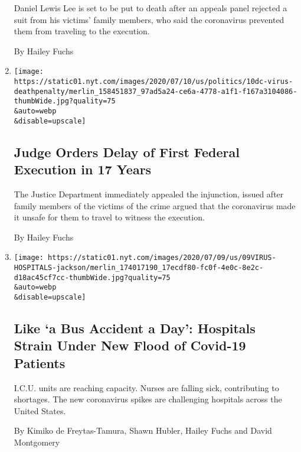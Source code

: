 \begin{enumerate}
  Daniel Lewis Lee is set to be put to death after an appeals panel
  rejected a suit from his victims' family members, who said the
  coronavirus prevented them from traveling to the execution.

  By Hailey Fuchs
\item
  \href{/2020/07/10/us/politics/first-federal-execution-delay.html}{}

  \texttt{[image: https://static01.nyt.com/images/2020/07/10/us/politics/10dc-virus-deathpenalty/merlin\_158451837\_97ad5a24-ce6a-4778-a1f1-f167a3104086-thumbWide.jpg?quality=75\\\&auto=webp\\\&disable=upscale]}

  \hypertarget{judge-orders-delay-of-first-federal-execution-in-17-years}{%
  \subsection{Judge Orders Delay of First Federal Execution in 17
  Years}\label{judge-orders-delay-of-first-federal-execution-in-17-years}}

  The Justice Department immediately appealed the injunction, issued
  after family members of the victims of the crime argued that the
  coronavirus made it unsafe for them to travel to witness the
  execution.

  By Hailey Fuchs
\item
  \href{/2020/07/09/us/coronavirus-hospitals-capacity.html}{}

  \texttt{[image: https://static01.nyt.com/images/2020/07/09/us/09VIRUS-HOSPITALS-jackson/merlin\_174017190\_17ecdf80-fc0f-4e0c-8e2c-d18ac45cf7cc-thumbWide.jpg?quality=75\\\&auto=webp\\\&disable=upscale]}

  \hypertarget{like-a-bus-accident-a-day-hospitals-strain-under-new-flood-of-covid-19-patients}{%
  \subsection{Like `a Bus Accident a Day': Hospitals Strain Under New
  Flood of Covid-19
  Patients}\label{like-a-bus-accident-a-day-hospitals-strain-under-new-flood-of-covid-19-patients}}

  I.C.U. units are reaching capacity. Nurses are falling sick,
  contributing to shortages. The new coronavirus spikes are challenging
  hospitals across the United States.

  By Kimiko de Freytas-Tamura, Shawn Hubler, Hailey Fuchs and David
  Montgomery
\end{enumerate}

